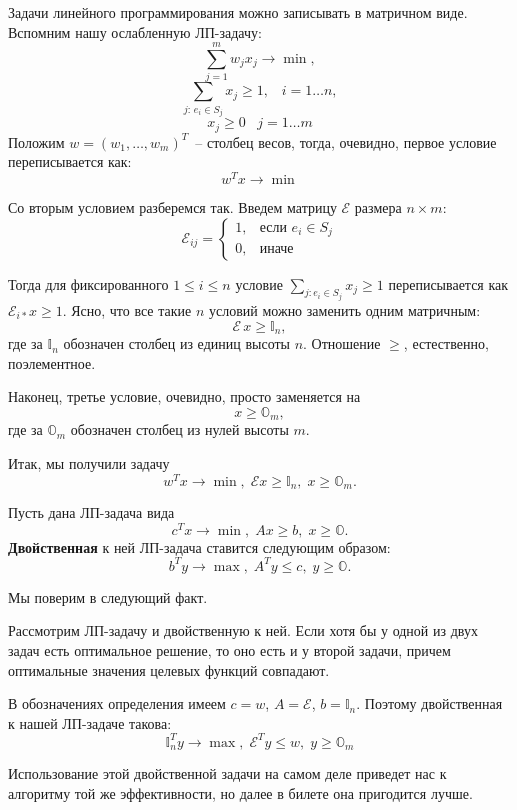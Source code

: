 Задачи линейного программирования можно записывать в матричном виде. Вспомним нашу ослабленную ЛП-задачу:
$$ \sum_{j=1}^m w_j x_j \rightarrow \min,$$
$$ \sum_{j:\, e_i \in S_j} x_j \geq 1, \;\;\; i=1\ldots n,$$
$$ x_j \geq 0 \;\;\; j=1\ldots m$$
Положим $w = (w_1, \ldots, w_m)^T$~-- столбец весов, тогда, очевидно, первое условие переписывается как: $$w^Tx \rightarrow \min$$

Со вторым условием разберемся так. Введем матрицу $\mathcal E$ размера $n \times m$:
$$
\mathcal{E}_{ij} = \begin{cases}
1, & \text{если } e_i \in S_j \\
0, & \text{иначе}
\end{cases}
$$

Тогда для фиксированного $1\leq i \leq n$ условие $\sum\limits_{j: e_i \in S_j} x_j \geq 1$ переписывается как $\mathcal{E}_{i*} x \geq 1$. Ясно, что все такие $n$ условий можно заменить одним матричным: $$\mathcal{E}\,x \geq \mathbb I_n,$$ где за $\mathbb I_n$ обозначен столбец из единиц высоты $n$. Отношение $\geq$, естественно, поэлементное.

Наконец, третье условие, очевидно, просто заменяется на $$x \geq \mathbb{O}_m,$$ где за $\mathbb{O}_m$ обозначен столбец из нулей высоты $m$.

Итак, мы получили задачу $$w^Tx \rightarrow \min, \; \mathcal{E} x \geq \mathbb{I}_n, \; x \geq \mathbb{O}_m.$$

\begin{definition*}
	Пусть дана ЛП-задача вида $$c^Tx\rightarrow\min, \; Ax \geq b, \; x \geq \mathbb{O}.$$ \textbf{Двойственная} к ней ЛП-задача ставится следующим образом: $$b^Ty \rightarrow\max, \;  A^Ty \leq c, \; y \geq \mathbb{O}.$$
\end{definition*}

Мы поверим в следующий факт.

\begin{theorem*}
	Рассмотрим ЛП-задачу и двойственную к ней. Если хотя бы у одной из двух задач есть оптимальное решение, то оно есть и у второй задачи, причем оптимальные значения целевых функций совпадают.
\end{theorem*}

В обозначениях определения имеем $c = w$, $A = \mathcal E$, $b = \mathbb{I}_n$. Поэтому двойственная к нашей ЛП-задаче такова:
$$\mathbb{I}_n^Ty \rightarrow \max, \; \mathcal{E}^T y \leq w, \; y \geq \mathbb{O}_m$$

Использование этой двойственной задачи на самом деле приведет нас к алгоритму той же эффективности, но далее в билете она пригодится лучше.

